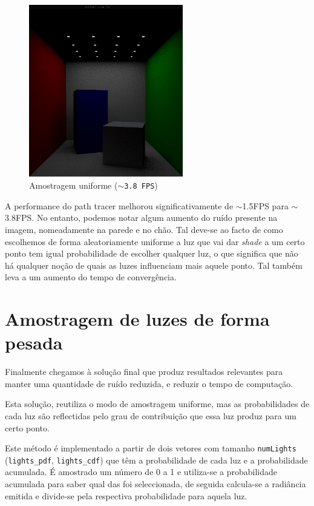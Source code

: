 \documentclass[a4paper]{report}
\begin{document}
\begin{figure}[H]
    \centering
    \includegraphics[width=0.6\textwidth]{images/test_2.png}
    \caption{Amostragem uniforme (\texttt{$\sim$3.8 FPS})}
\end{figure}

A performance do path tracer melhorou significativamente de $\sim$1.5FPS para
$\sim$3.8FPS. No entanto,  podemos notar algum aumento do ruído presente na
imagem, nomeadamente na parede e no chão. Tal deve-se ao facto de como escolhemos
de forma aleatoriamente uniforme a luz que vai dar \textit{shade} a um certo ponto
tem igual probabilidade de escolher qualquer luz,  o que significa que não há
qualquer noção de quais as luzes influenciam mais aquele ponto. Tal também leva a
um aumento do tempo de convergência.

\section{Amostragem de luzes de forma pesada}

Finalmente chegamos à solução final que produz resultados relevantes para manter
uma quantidade de ruído reduzida, e reduzir o tempo de computação.

Esta solução, reutiliza o modo de amostragem uniforme, mas as probabilidades de
cada luz são reflectidas pelo grau de contribuição que essa luz produz para um
certo ponto.

Este método é implementado a partir de dois vetores com tamanho \texttt{numLights}
(\texttt{lights\_pdf}, \texttt{lights\_cdf}) que têm a probabilidade de cada luz e
a probabilidade acumulada. É amostrado um número de 0 a 1 e utiliza-se a
probabilidade acumulada para saber qual das foi seleccionada, de seguida
calcula-se a radiância emitida e divide-se pela respectiva probabilidade para
aquela luz. 
\end{document}
